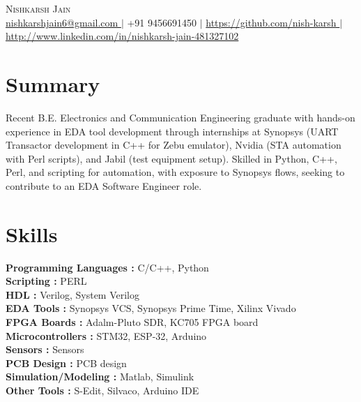 \documentclass[letterpaper,11pt]{article}
\begin{document}
\begin{center}
    {\Huge \scshape Nishkarsh Jain} \\ \vspace{4pt}
    \small
\href{mailto:nishkarshjain6@gmail.com}{ nishkarshjain6@gmail.com } $|$ +91 9456691450 $|$ \href{ https://github.com/nish-karsh }{ https://github.com/nish-karsh } $|$ \href{ http://www.linkedin.com/in/nishkarsh-jain-481327102 }{ http://www.linkedin.com/in/nishkarsh-jain-481327102 }\end{center}

\section{Summary}
\small{ Recent B.E. Electronics and Communication Engineering graduate with hands-on experience in EDA tool development through internships at Synopsys (UART Transactor development in C++ for Zebu emulator), Nvidia (STA automation with Perl scripts), and Jabil (test equipment setup). Skilled in Python, C++, Perl, and scripting for automation, with exposure to Synopsys flows, seeking to contribute to an EDA Software Engineer role. }

\section{Skills}
\begin{itemize}[leftmargin=0.15in, label={}]
  \small{\item{
    \textbf{ Programming Languages :} C/C++, Python \\
    \textbf{ Scripting :} PERL \\
    \textbf{ HDL :} Verilog, System Verilog \\
    \textbf{ EDA Tools :} Synopsys VCS, Synopsys Prime Time, Xilinx Vivado \\
    \textbf{ FPGA Boards :} Adalm-Pluto SDR, KC705 FPGA board \\
    \textbf{ Microcontrollers :} STM32, ESP-32, Arduino \\
    \textbf{ Sensors :} Sensors \\
    \textbf{ PCB Design :} PCB design \\
    \textbf{ Simulation/Modeling :} Matlab, Simulink \\
    \textbf{ Other Tools :} S-Edit, Silvaco, Arduino IDE \\
  }}
\end{itemize}
\end{document}
